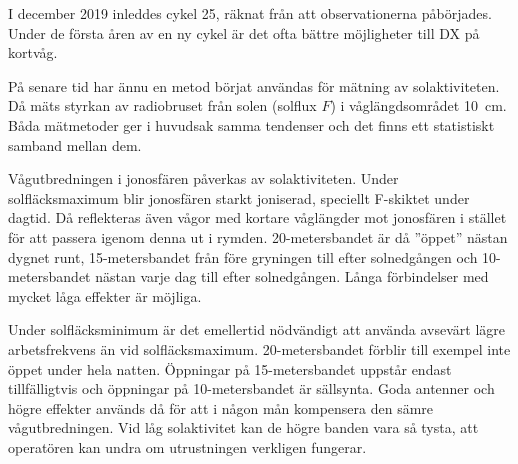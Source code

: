 I december 2019 inleddes cykel 25, räknat från att observationerna påbörjades.
Under de första åren av en ny cykel är det ofta bättre möjligheter till DX på
kortvåg.

På senare tid har ännu en metod börjat användas för mätning av solaktiviteten.
Då mäts styrkan av radiobruset från solen (solflux \(F\)) i våglängdsområdet
\qty{10}{\centi\metre}.
Båda mätmetoder ger i huvudsak samma tendenser och det finns ett
statistiskt samband mellan dem.

Vågutbredningen i jonosfären påverkas av solaktiviteten.
Under solfläcksmaximum blir jonosfären starkt joniserad, speciellt F-skiktet
under dagtid.
Då reflekteras även vågor med kortare våglängder mot jonosfären i stället för
att passera igenom denna ut i rymden.
20-metersbandet är då ''öppet'' nästan dygnet runt, 15-metersbandet från före
gryningen till efter solnedgången och 10-metersbandet nästan varje dag till
efter solnedgången.
Långa förbindelser med mycket låga effekter är möjliga.

Under solfläcksminimum är det emellertid nödvändigt att använda avsevärt lägre
arbetsfrekvens än vid solfläcksmaximum.
20-metersbandet förblir till exempel inte öppet under hela natten.
Öppningar på 15-metersbandet uppstår endast tillfälligtvis och öppningar på
10-metersbandet är sällsynta.
Goda antenner och högre effekter används då för att i någon mån kompensera den
sämre vågutbredningen.
Vid låg solaktivitet kan de högre banden vara så tysta, att operatören kan
undra om utrustningen verkligen fungerar.
